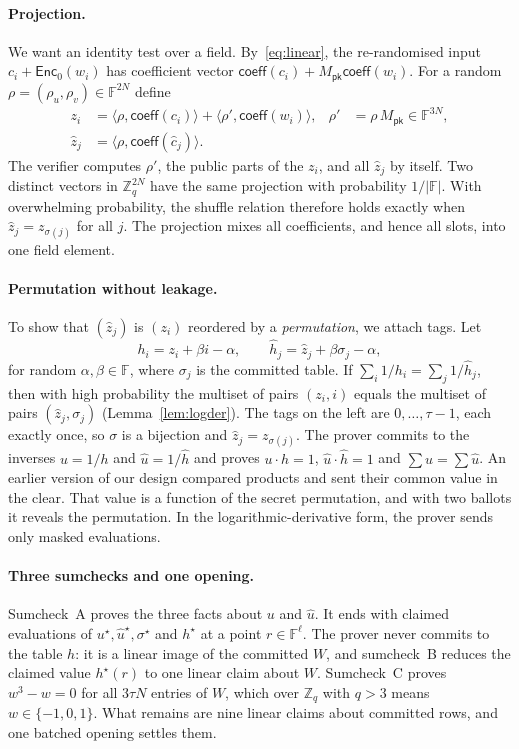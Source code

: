 \documentclass[sigconf,anonymous]{acmart}
\newcommand{\Zq}{\mathbb{Z}_q}
\newcommand{\F}{\mathbb{F}}
\newcommand{\EncZ}{\mathsf{Enc}_0}
\newcommand{\coeff}{\mathsf{coeff}}
\newcommand{\Mpk}{M_{\mathsf{pk}}}
\newcommand{\ip}[2]{\langle #1, #2\rangle}
\newcommand{\msk}[1]{#1^{\star}}
\newcommand{\uh}{\hat{u}}
\newcommand{\hh}{\hat{h}}
\newcommand{\zh}{\hat{z}}
\newcommand{\ch}{\hat{c}}
\begin{document}
\paragraph{Projection.}
We want an identity test over a field. By~\eqref{eq:linear}, the re-randomised input
$c_i+\EncZ(w_i)$ has coefficient vector $\coeff(c_i)+\Mpk\coeff(w_i)$. For a random
$\rho=(\rho_u,\rho_v)\in\F^{2N}$ define
\begin{align*}
  z_i &= \ip{\rho}{\coeff(c_i)}+\ip{\rho'}{\coeff(w_i)}, & \rho' &=\rho\,\Mpk\in\F^{3N},\\
  \zh_j &= \ip{\rho}{\coeff(\ch_j)} .
\end{align*}
The verifier computes $\rho'$, the public parts of the $z_i$, and all $\zh_j$ by itself. Two
distinct vectors in $\Zq^{2N}$ have the same projection with probability $1/|\F|$. With
overwhelming probability, the shuffle relation therefore holds exactly when $\zh_j=z_{\sigma(j)}$
for all $j$. The projection mixes all coefficients, and hence all slots, into one field element.

\paragraph{Permutation without leakage.}
To show that $(\zh_j)$ is $(z_i)$ reordered by a \emph{permutation}, we attach tags. Let
\[
  h_i=z_i+\beta i-\alpha,\qquad \hh_j=\zh_j+\beta\sigma_j-\alpha ,
\]
for random $\alpha,\beta\in\F$, where $\sigma_j$ is the committed table. If
$\sum_i 1/h_i=\sum_j 1/\hh_j$, then with high probability the multiset of pairs $(z_i,i)$ equals
the multiset of pairs $(\zh_j,\sigma_j)$ (Lemma~\ref{lem:logder}). The tags on the left are
$0,\dots,\tau-1$, each exactly once, so $\sigma$ is a bijection and $\zh_j=z_{\sigma(j)}$. The
prover commits to the inverses $u=1/h$ and $\uh=1/\hh$ and proves $u\cdot h=1$, $\uh\cdot\hh=1$ and
$\sum u=\sum\uh$. An earlier version of our design compared products and sent their common value in
the clear. That value is a function of the secret permutation, and with two ballots it reveals the
permutation. In the logarithmic-derivative form, the prover sends only masked evaluations.

\paragraph{Three sumchecks and one opening.}
Sumcheck~A proves the three facts about $u$ and $\uh$. It ends with claimed evaluations of
$\msk{u},\msk{\uh},\msk{\sigma}$ and $\msk{h}$ at a point $r\in\F^{\ell}$. The prover never commits to
the table $h$: it is a linear image of the committed $W$, and sumcheck~B reduces the claimed value
$\msk{h}(r)$ to one linear claim about $W$. Sumcheck~C proves $w^3-w=0$ for all $3\tau N$ entries of
$W$, which over $\Zq$ with $q>3$ means $w\in\{-1,0,1\}$. What remains are nine linear claims about
committed rows, and one batched opening settles them.
\end{document}
